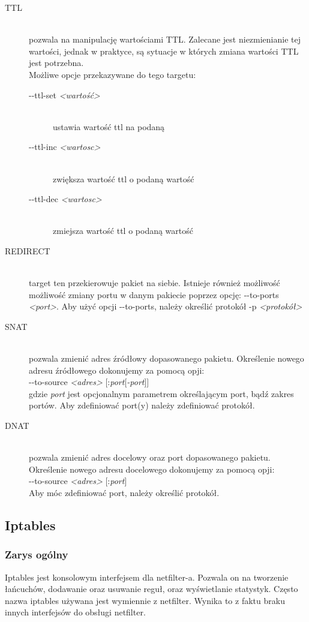 \documentclass[a4paper,12pt]{book}
\newcommand{\param}[1]{\textit{\textless #1\textgreater}}
\begin{document}
\begin{description}
					\item[TTL] \hfill \\
						pozwala na manipulację wartościami TTL. Zalecane jest niezmienianie tej wartości, jednak w praktyce, są sytuacje w których zmiana wartości TTL jest potrzebna.\\
						Możliwe opcje przekazywane do tego targetu:
						\begin{description}
							\item[-{}-ttl-set \param{wartość}] \hfill \\
								ustawia wartość ttl na podaną
							\item[-{}-ttl-inc \param{wartosc}] \hfill \\
								zwiększa wartość ttl o podaną wartość
							\item[-{}-ttl-dec \param{wartosc}] \hfill \\
								zmiejsza wartość ttl o podaną wartość
						\end{description}
					\item[REDIRECT] \hfill \\
						target ten przekierowuje pakiet na siebie. Istnieje również możliwość możliwość zmiany portu w danym pakiecie poprzez opcję: -{}-to-ports \param{port}.
						Aby użyć opcji -{}-to-ports, należy określić protokół -p \param{protokół}
					\item[SNAT] \hfill \\
						pozwala zmienić adres źródłowy dopasowanego pakietu. Określenie nowego adresu źródłowego dokonujemy za pomocą opji:\\
						-{}-to-source \param{adres} [:\textit{port}[\textit{-port}]]\\
						gdzie \textit{port} jest opcjonalnym parametrem określającym port, bądź zakres portów. Aby zdefiniować port(y) należy zdefiniować protokół.
					\item[DNAT] \hfill \\
						pozwala zmienić adres docelowy oraz port dopasowanego pakietu. Określenie nowego adresu docelowego dokonujemy za pomocą opji:\\
						-{}-to-source \param{adres} [:\textit{port}]\\
						Aby móc zdefiniować port, należy określić protokół.
				\end{description}
	\subsection{Iptables}
		\subsubsection{Zarys ogólny}
			Iptables jest konsolowym interfejsem dla netfilter-a. Pozwala on na tworzenie łańcuchów, dodawanie oraz usuwanie reguł, oraz wyświetlanie statystyk.
			Często nazwa iptables używana jest wymiennie z netfilter. Wynika to z faktu braku innych interfejsów do obsługi netfilter.
\end{document}
